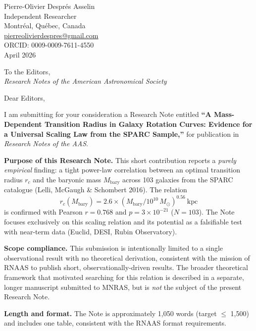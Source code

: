 \documentclass[12pt]{article}
\begin{document}
\begin{flushright}
  Pierre-Olivier Despr\'{e}s Asselin \\
  Independent Researcher \\
  Montr\'{e}al, Qu\'{e}bec, Canada \\
  \href{mailto:pierreolivierdespres@gmail.com}{pierreolivierdespres@gmail.com} \\
  ORCID: 0009-0009-7611-4550 \\[6pt]
  April 2026
\end{flushright}

\bigskip

\noindent
To the Editors, \\
\textit{Research Notes of the American Astronomical Society}

\bigskip

Dear Editors,

I am submitting for your consideration a Research Note entitled
\textbf{``A Mass-Dependent Transition Radius in Galaxy Rotation
Curves: Evidence for a Universal Scaling Law from the SPARC Sample,''}
for publication in \textit{Research Notes of the AAS}.

\bigskip

\textbf{Purpose of this Research Note.}
This short contribution reports a \emph{purely empirical} finding: a
tight power-law correlation between an optimal transition radius
$r_c$ and the baryonic mass $M_\mathrm{bary}$ across 103 galaxies
from the SPARC catalogue (Lelli, McGaugh \& Schombert 2016). The
relation
\[
    r_c(M_\mathrm{bary}) = 2.6 \times
      (M_\mathrm{bary} / 10^{10}\,M_\odot)^{0.56}\ \mathrm{kpc}
\]
is confirmed with Pearson $r = 0.768$ and $p = 3\times10^{-21}$
($N = 103$). The Note focuses exclusively on this scaling relation and
its potential as a falsifiable test with near-term data (Euclid, DESI,
Rubin Observatory).

\bigskip

\textbf{Scope compliance.}
This submission is intentionally limited to a single observational
result with no theoretical derivation, consistent with the mission of
RNAAS to publish short, observationally-driven results. The broader
theoretical framework that motivated searching for this relation is
described in a separate, longer manuscript submitted to MNRAS, but is
\emph{not} the subject of the present Research Note.

\bigskip

\textbf{Length and format.}
The Note is approximately 1,050 words (target $\le$ 1,500) and
includes one table, consistent with the RNAAS format requirements.
\end{document}

